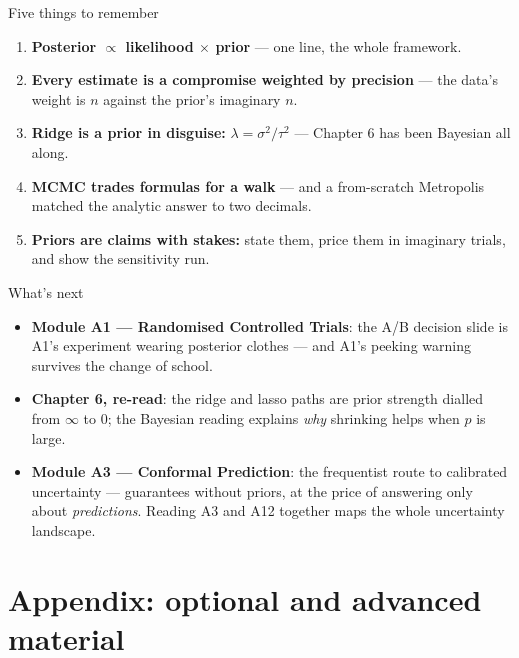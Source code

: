 \documentclass[aspectratio=169,11pt]{beamer}
\begin{document}
\begin{frame}{Five things to remember}
  \begin{takeaway}
    \begin{enumerate}
      \item \textbf{Posterior $\propto$ likelihood $\times$ prior} --- one line,
            the whole framework.
      \item \textbf{Every estimate is a compromise weighted by precision} --- the
            data's weight is $n$ against the prior's imaginary $n$.
      \item \textbf{Ridge is a prior in disguise:} $\lambda = \sigma^2/\tau^2$ ---
            Chapter 6 has been Bayesian all along.
      \item \textbf{MCMC trades formulas for a walk} --- and a from-scratch
            Metropolis matched the analytic answer to two decimals.
      \item \textbf{Priors are claims with stakes:} state them, price them in
            imaginary trials, and show the sensitivity run.
    \end{enumerate}
  \end{takeaway}
\end{frame}

\begin{frame}{What's next}
  \begin{itemize}
    \item \textbf{Module A1 --- Randomised Controlled Trials}: the A/B decision
          slide is A1's experiment wearing posterior clothes --- and A1's peeking
          warning survives the change of school.
    \item \textbf{Chapter 6, re-read}: the ridge and lasso paths are prior
          strength dialled from $\infty$ to $0$; the Bayesian reading explains
          \emph{why} shrinking helps when $p$ is large.
    \item \textbf{Module A3 --- Conformal Prediction}: the frequentist route to
          calibrated uncertainty --- guarantees without priors, at the price of
          answering only about \emph{predictions}. Reading A3 and A12 together
          maps the whole uncertainty landscape.
  \end{itemize}
\end{frame}

\appendix
\AtBeginSection[]{}
\section{Appendix: optional and advanced material}
\end{document}
